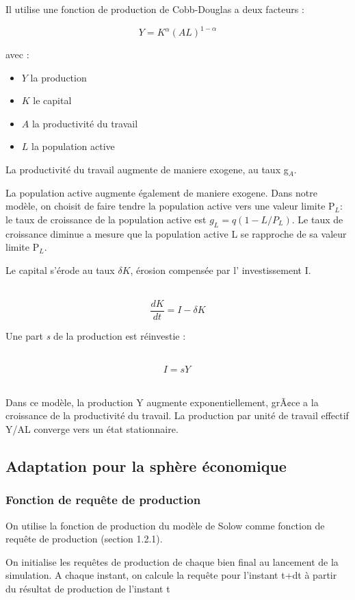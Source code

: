 \documentclass[12pt,a4paper]{article}%
\begin{document}
Il utilise une fonction de production de Cobb-Douglas a deux facteurs :%

\[
Y=K^{\alpha}(AL)^{1-\alpha}%
\]


avec :

\begin{itemize}
\item $Y$ la production

\item $K$ le capital

\item $A$ la productivité du travail

\item $L$ la population active
\end{itemize}

La productivité du travail augmente de maniere exogene, au taux g$_{A }$.

La population active augmente également de maniere exogene. Dans notre
modèle, on choisit de faire tendre la population active vers une valeur
limite P$_{L}$: le taux de croissance de la population active est
$g_{L}=q(1-L/P_{L})$. Le taux de croissance diminue a mesure que la population
active L se rapproche de sa valeur limite P$_{L}$.

Le capital s'érode au taux $\delta K$, érosion compensée par l' investissement I.

\ \ \ \ \ \ \ \ \ \ \ \
\[
\frac{dK}{dt} = I-\delta K
\]


Une part \textit{s} de la production est réinvestie :

\ \ \ \ \ \ \ \ \ \ \
\[
\ I=sY\ \
\]
\ \ 

Dans ce modèle, la production Y augmente exponentiellement, grÃ¢ce a la
croissance de la productivité du travail. La production par unité de travail
effectif Y/AL converge vers un état stationnaire.

\subsection{Adaptation pour la sphère économique}

\subsubsection{Fonction de requête de production}

On utilise la fonction de production du modèle de Solow comme fonction de
requête de production (section 1.2.1).

On initialise les requêtes de production de chaque bien final au lancement de
la simulation. A chaque instant, on calcule la requête pour l'instant t+dt
à partir du résultat de production de l'instant t%
\end{document}
